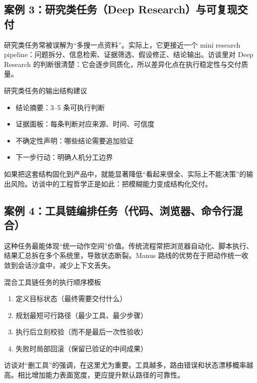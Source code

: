 \subsection{案例 3：研究类任务（Deep Research）与可复现交付}

研究类任务常被误解为“多搜一点资料”。实际上，它更接近一个 mini research pipeline：问题拆分、信息检索、证据筛选、假设修正、结论输出。访谈里对 Deep Research 的判断很清楚：它会逐步同质化，所以差异化点在执行稳定性与交付质量。

\begin{knowledgebox}{研究类任务的输出结构建议}
\begin{itemize}
    \item 结论摘要：3--5 条可执行判断
    \item 证据面板：每条判断对应来源、时间、可信度
    \item 不确定性声明：哪些结论需要追加验证
    \item 下一步行动：明确人机分工边界
\end{itemize}
\end{knowledgebox}

如果把这套结构固化到产品中，就能显著降低“看起来很全、实际上不能决策”的输出风险。访谈中的工程哲学正是如此：把模糊能力变成结构化交付。

\subsection{案例 4：工具链编排任务（代码、浏览器、命令行混合）}

这种任务最能体现“统一动作空间”价值。传统流程常把浏览器自动化、脚本执行、结果汇总拆在多个系统里，导致状态断裂。Manus 路线的优势在于把动作统一收敛到会话沙盒中，减少上下文丢失。

\begin{importantbox}{混合工具链任务的执行顺序模板}
\begin{enumerate}
    \item 定义目标状态（最终需要交付什么）
    \item 规划最短可行路径（最少工具、最少步骤）
    \item 执行后立刻校验（而不是最后一次性验收）
    \item 失败时局部回滚（保留已验证的中间成果）
\end{enumerate}
\end{importantbox}

访谈对“删工具”的强调，在这里尤为重要。工具越多，路由错误和状态漂移概率越高。相比增加能力表面宽度，更应提升默认路径的可靠性。

